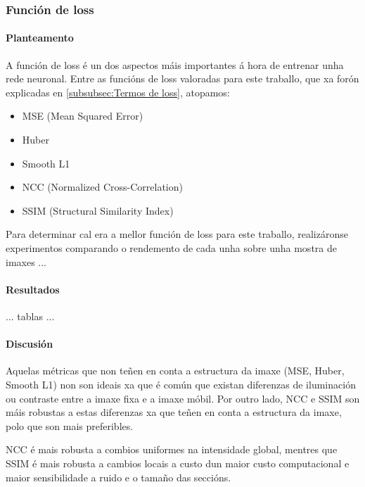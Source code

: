\subsubsection{Función de loss}
\label{subsubsec:Función de loss}

\paragraph{Planteamento}
\label{par:Planteamento}

A función de loss é un dos aspectos máis importantes á hora de entrenar unha rede neuronal.
Entre as funcións de loss valoradas para este traballo, que xa forón explicadas en \ref{subsubsec:Termos de loss}, atopamos:

\begin{itemize}
    \item MSE (Mean Squared Error)
    \item Huber
    \item Smooth L1
    \item NCC (Normalized Cross-Correlation)
    \item SSIM (Structural Similarity Index)
\end{itemize}


Para determinar cal era a mellor función de loss para este traballo, realizáronse experimentos comparando o rendemento de cada unha sobre unha mostra de imaxes ...

\paragraph{Resultados}
\label{par:Resultados}

... tablas ...

\paragraph{Discusión}
\label{par:Discusión}

Aquelas métricas que non teñen en conta a estructura da imaxe (MSE, Huber, Smooth L1) non son ideais xa que é común que existan diferenzas de iluminación ou contraste entre a imaxe fixa e a imaxe móbil.
Por outro lado, NCC e SSIM son máis robustas a estas diferenzas xa que teñen en conta a estructura da imaxe, polo que son mais preferibles.

NCC é mais robusta a combios uniformes na intensidade global, mentres que SSIM é mais robusta a cambios locais a custo dun maior custo computacional e maior sensibilidade a ruido e o tamaño das seccións.

